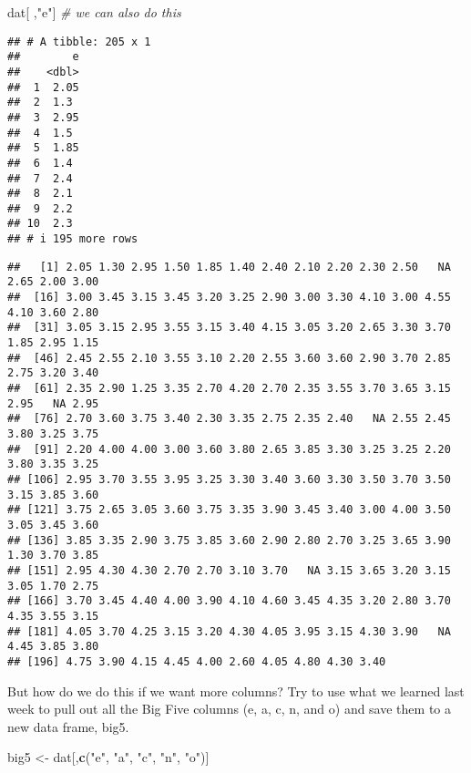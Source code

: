 \documentclass[
]{article}
\newenvironment{Shaded}{\begin{snugshade}}{\end{snugshade}}
\newcommand{\CommentTok}[1]{\textcolor[rgb]{0.56,0.35,0.01}{\textit{#1}}}
\newcommand{\FunctionTok}[1]{\textcolor[rgb]{0.13,0.29,0.53}{\textbf{#1}}}
\newcommand{\NormalTok}[1]{#1}
\newcommand{\OtherTok}[1]{\textcolor[rgb]{0.56,0.35,0.01}{#1}}
\newcommand{\SpecialCharTok}[1]{\textcolor[rgb]{0.81,0.36,0.00}{\textbf{#1}}}
\newcommand{\StringTok}[1]{\textcolor[rgb]{0.31,0.60,0.02}{#1}}
\begin{document}
\begin{Shaded}
\begin{Highlighting}[]
\NormalTok{dat[ ,}\StringTok{"e"}\NormalTok{] }\CommentTok{\# we can also do this}
\end{Highlighting}
\end{Shaded}

\begin{verbatim}
## # A tibble: 205 x 1
##        e
##    <dbl>
##  1  2.05
##  2  1.3 
##  3  2.95
##  4  1.5 
##  5  1.85
##  6  1.4 
##  7  2.4 
##  8  2.1 
##  9  2.2 
## 10  2.3 
## # i 195 more rows
\end{verbatim}

\begin{Shaded}
\end{Shaded}

\begin{verbatim}
##   [1] 2.05 1.30 2.95 1.50 1.85 1.40 2.40 2.10 2.20 2.30 2.50   NA 2.65 2.00 3.00
##  [16] 3.00 3.45 3.15 3.45 3.20 3.25 2.90 3.00 3.30 4.10 3.00 4.55 4.10 3.60 2.80
##  [31] 3.05 3.15 2.95 3.55 3.15 3.40 4.15 3.05 3.20 2.65 3.30 3.70 1.85 2.95 1.15
##  [46] 2.45 2.55 2.10 3.55 3.10 2.20 2.55 3.60 3.60 2.90 3.70 2.85 2.75 3.20 3.40
##  [61] 2.35 2.90 1.25 3.35 2.70 4.20 2.70 2.35 3.55 3.70 3.65 3.15 2.95   NA 2.95
##  [76] 2.70 3.60 3.75 3.40 2.30 3.35 2.75 2.35 2.40   NA 2.55 2.45 3.80 3.25 3.75
##  [91] 2.20 4.00 4.00 3.00 3.60 3.80 2.65 3.85 3.30 3.25 3.25 2.20 3.80 3.35 3.25
## [106] 2.95 3.70 3.55 3.95 3.25 3.30 3.40 3.60 3.30 3.50 3.70 3.50 3.15 3.85 3.60
## [121] 3.75 2.65 3.05 3.60 3.75 3.35 3.90 3.45 3.40 3.00 4.00 3.50 3.05 3.45 3.60
## [136] 3.85 3.35 2.90 3.75 3.85 3.60 2.90 2.80 2.70 3.25 3.65 3.90 1.30 3.70 3.85
## [151] 2.95 4.30 4.30 2.70 2.70 3.10 3.70   NA 3.15 3.65 3.20 3.15 3.05 1.70 2.75
## [166] 3.70 3.45 4.40 4.00 3.90 4.10 4.60 3.45 4.35 3.20 2.80 3.70 4.35 3.55 3.15
## [181] 4.05 3.70 4.25 3.15 3.20 4.30 4.05 3.95 3.15 4.30 3.90   NA 4.45 3.85 3.80
## [196] 4.75 3.90 4.15 4.45 4.00 2.60 4.05 4.80 4.30 3.40
\end{verbatim}

But how do we do this if we want more columns? Try to use what we
learned last week to pull out all the Big Five columns (e, a, c, n, and
o) and save them to a new data frame, big5.

\begin{Shaded}
\begin{Highlighting}[]
\NormalTok{big5 }\OtherTok{\textless{}{-}}\NormalTok{ dat[,}\FunctionTok{c}\NormalTok{(}\StringTok{"e"}\NormalTok{, }\StringTok{"a"}\NormalTok{, }\StringTok{"c"}\NormalTok{, }\StringTok{"n"}\NormalTok{, }\StringTok{"o"}\NormalTok{)]}
\end{Highlighting}
\end{Shaded}
\end{document}

